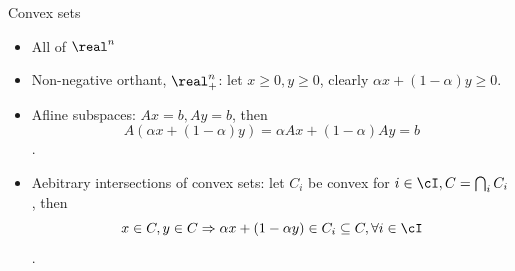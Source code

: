 \documentclass[draft]{beamer}
\begin{document}
\begin{frame}{Convex sets} 
	\begin{example}
		\begin{itemize}
			\item All of $\real^n$
			\item Non-negative orthant, $\real_+^n$: let $x \ge 0, y\ge 0$, clearly $\alpha x + (1-\alpha) y \ge 0$. 
			\item Afline subspaces: $Ax=b, Ay=b$, then 
			$$A(\alpha x+(1-\alpha) y)=\alpha Ax + (1-\alpha)Ay = b$$. 
			\item Aebitrary intersections of convex sets: let $C_i$ be convex for $i\in \cI, C = \bigcap_i C_i$, then 
			$$x\in C,y\in C \Rightarrow \alpha x +(1-\alpha y) \in C_i \subseteq C, \forall i \in \cI $$.
		\end{itemize}
	\end{example}
\end{frame}
\end{document}

